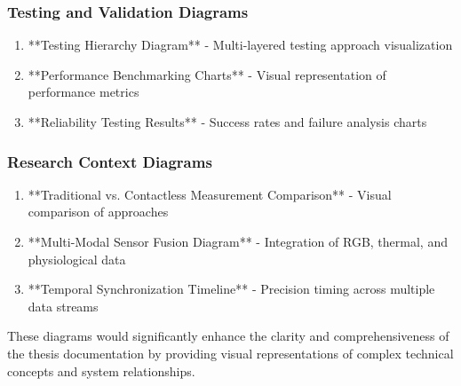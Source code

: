 \documentclass[12pt,a4paper]{report}
\begin{document}
\subsubsection{Testing and Validation Diagrams}

\begin{enumerate}
\item **Testing Hierarchy Diagram** - Multi-layered testing approach visualization
\item **Performance Benchmarking Charts** - Visual representation of performance metrics
\item **Reliability Testing Results** - Success rates and failure analysis charts

\end{enumerate}
\subsubsection{Research Context Diagrams}

\begin{enumerate}
\item **Traditional vs. Contactless Measurement Comparison** - Visual comparison of approaches
\item **Multi-Modal Sensor Fusion Diagram** - Integration of RGB, thermal, and physiological data
\item **Temporal Synchronization Timeline** - Precision timing across multiple data streams

\end{enumerate}
These diagrams would significantly enhance the clarity and comprehensiveness of the thesis documentation by providing
visual representations of complex technical concepts and system relationships.
\end{document}

